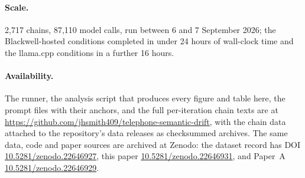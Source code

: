 \documentclass[11pt]{article}
\begin{document}
\paragraph{Scale.}
2{,}717 chains, 87{,}110 model calls, run between 6 and 7 September 2026;
the Blackwell-hosted conditions completed in under 24 hours of wall-clock
time and the llama.cpp conditions in a further 16 hours.

\paragraph{Availability.}
The runner, the analysis script that produces every figure and table here,
the prompt files with their anchors, and the full per-iteration chain
texts are at \url{https://github.com/jhsmith409/telephone-semantic-drift},
with the chain data attached to the repository's data releases as
checksummed archives. The same data, code and paper sources are archived at
Zenodo: the dataset record has DOI \href{https://doi.org/10.5281/zenodo.22646927}{10.5281/zenodo.22646927},
this paper \href{https://doi.org/10.5281/zenodo.22646931}{10.5281/zenodo.22646931}, and Paper~A
\href{https://doi.org/10.5281/zenodo.22646929}{10.5281/zenodo.22646929}.
\end{document}
